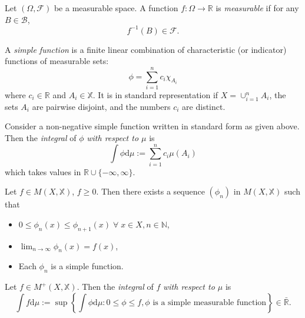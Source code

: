 \begin{definition}
    Let $(\Omega,\mathcal{F})$ be a measurable space. A function $f:\Omega\rightarrow\mathbb{R}$
    is \emph{measurable} if for any $B\in\mathcal{B}$,
    \begin{equation*}
        f^{-1}(B)\in\mathcal{F}.
    \end{equation*}
\end{definition}

\begin{definition}
    A \emph{simple function} is a finite linear combination of 
    characteristic (or indicator) functions of measurable sets:
    \begin{equation*}
        \phi=\sum_{i=1}^nc_i\chi_{A_i}
    \end{equation*}
    where $c_i\in\mathbb{R}$ and $A_i\in\mathbb{X}$.
    It is in standard representation if $X=\cup_{i=1}^nA_i$,
    the sets $A_i$ are pairwise disjoint, and the numbers $c_i$
    are distinct.
\end{definition}

\begin{definition}
    Consider a non-negative simple function written in standard form as given above.
    Then the \emph{integral} of $\phi$ \emph{with respect to $\mu$} is
    \begin{equation*}
        \int\phi\mathrm d\mu:=\sum_{i=1}^nc_i\mu(A_i)
    \end{equation*}
    which takes values in $\mathbb{R}\cup\{-\infty,\infty\}$.
\end{definition}

\begin{lemma}
    Let $f\in M(X,\mathbb{X})$, $f\geq0.$ Then there exists a sequence
    $(\phi_n)$ in $M(X,\mathbb{X})$ such that
    \begin{itemize}
        \item $0\leq\phi_n(x)\leq\phi_{n+1}(x)\;\forall\;x\in X,n\in\mathbb{N}$,
        \item $\lim_{n\rightarrow\infty}\phi_n(x)=f(x)$,
        \item Each $\phi_n$ is a simple function.
    \end{itemize}
\end{lemma}

\begin{definition}
    Let $f\in M^+(X,\mathbb{X})$. Then the \emph{integral} of $f$ 
    \emph{with respect to $\mu$} is 
    \begin{equation*}
        \int f\mathrm d\mu := \sup\left\{\int\phi\mathrm d\mu : 0\leq\phi\leq f, \phi\textrm{ is a simple measurable function}\right\}\in\bar{\mathbb{R}}.
    \end{equation*}
\end{definition}

